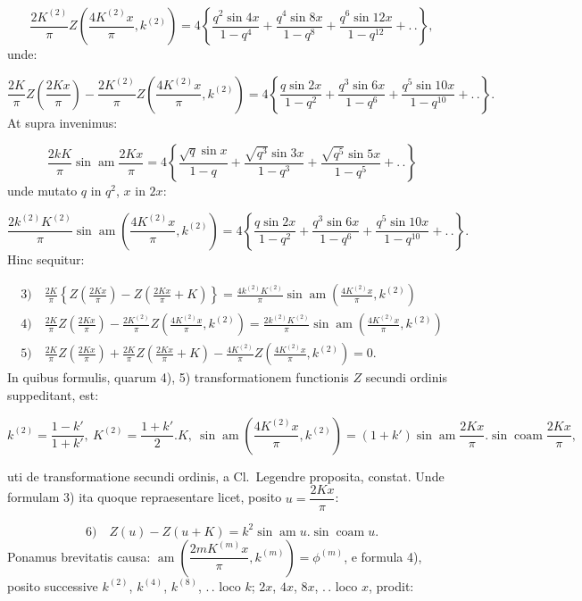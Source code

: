 \documentclass{article}
\begin{document}
\[
\frac{2K^{(2)}}{\pi}Z\left(\frac{4K^{(2)}x}{\pi},k^{(2)}\right)=4\left\{\frac{q^{2}\sin4x}{1-q^{4}}+\frac{q^{4}\sin8x}{1-q^{8}}+\frac{q^{6}\sin12x}{1-q^{12}}+.\,.\right\},
\]
unde:

\[
\frac{2K}{\pi}Z\left(\frac{2Kx}{\pi}\right)-\frac{2K^{(2)}}{\pi}Z\left(\frac{4K^{(2)}x}{\pi},k^{(2)}\right)=4\left\{\frac{q\sin2x}{1-q^{2}}+\frac{q^{3}\sin6x}{1-q^{6}}+\frac{q^{5}\sin10x}{1-q^{10}}+.\,.\right\}.
\]
At supra invenimus:

\[
\frac{2kK}{\pi}\sin\operatorname{am}\frac{2Kx}{\pi}=4\left\{\frac{\sqrt{q}\sin x}{1-q}+\frac{\sqrt{q^{3}}\sin3x}{1-q^{3}}+\frac{\sqrt{q^{5}}\sin5x}{1-q^{5}}+.\,.\right\}
\]
unde mutato $q$ in $q^{2}$, $x$ in $2x$:

\[
\frac{2k^{(2)}K^{(2)}}{\pi}\sin\operatorname{am}\left(\frac{4K^{(2)}x}{\pi},k^{(2)}\right)=4\left\{\frac{q\sin2x}{1-q^{2}}+\frac{q^{3}\sin6x}{1-q^{6}}+\frac{q^{5}\sin10x}{1-q^{10}}+.\,.\right\}.
\]
Hinc sequitur:

\[
\begin{gathered}
\text{3)}\quad\frac{2K}{\pi}\left\{Z\left(\frac{2Kx}{\pi}\right)-Z\left(\frac{2Kx}{\pi}+K\right)\right\}=\frac{4k^{(2)}K^{(2)}}{\pi}\sin\operatorname{am}\left(\frac{4K^{(2)}x}{\pi},k^{(2)}\right)\\[1.5ex]
\text{4)}\quad\frac{2K}{\pi}Z\left(\frac{2Kx}{\pi}\right)-\frac{2K^{(2)}}{\pi}Z\left(\frac{4K^{(2)}x}{\pi},k^{(2)}\right)=\frac{2k^{(2)}K^{(2)}}{\pi}\sin\operatorname{am}\left(\frac{4K^{(2)}x}{\pi},k^{(2)}\right)\\[1.5ex]
\text{5)}\quad\frac{2K}{\pi}Z\left(\frac{2Kx}{\pi}\right)+\frac{2K}{\pi}Z\left(\frac{2Kx}{\pi}+K\right)-\frac{4K^{(2)}}{\pi}Z\left(\frac{4K^{(2)}x}{\pi},k^{(2)}\right)=0.
\end{gathered}
\]
In quibus formulis, quarum 4), 5) transformationem functionis $Z$ secundi ordinis suppeditant, est:

\[
k^{(2)}=\frac{1-k'}{1+k'},\ K^{(2)}=\frac{1+k'}{2}.K,\ \sin\operatorname{am}\left(\frac{4K^{(2)}x}{\pi},k^{(2)}\right)=(1+k')\sin\operatorname{am}\frac{2Kx}{\pi}.\sin\operatorname{coam}\frac{2Kx}{\pi},
\]

uti de transformatione secundi ordinis, a Cl.\ Legendre proposita, constat. Unde formulam 3) ita quoque repraesentare licet, posito $u=\dfrac{2Kx}{\pi}$:

\[
\text{6)}\quad Z(u)-Z(u+K)=k^{2}\sin\operatorname{am}u.\sin\operatorname{coam}u.
\]
Ponamus brevitatis causa: $\operatorname{am}\left(\dfrac{2mK^{(m)}x}{\pi},k^{(m)}\right)=\phi^{(m)}$, e formula 4), posito successive $k^{(2)}$, $k^{(4)}$, $k^{(8)}$, $.\,.$ loco $k$; $2x$, $4x$, $8x$, $.\,.$ loco $x$, prodit:
\end{document}
